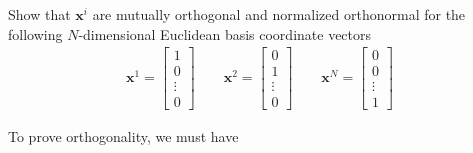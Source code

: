 \noindent 

\begin{homework}
	Show that $\bm{x}^i$ are mutually orthogonal and normalized \ie orthonormal for the following $N$-dimensional Euclidean basis coordinate vectors
	\begin{align}
		\bm{x}^1 = \begin{bmatrix}
			1 \\ 0 \\ \vdots \\ 0
		\end{bmatrix}
		\qquad
		\bm{x}^2 = \begin{bmatrix}
			0 \\ 1 \\ \vdots \\ 0
		\end{bmatrix}
		\qquad
		\bm{x}^N = \begin{bmatrix}
			0 \\ 0 \\ \vdots \\ 1
		\end{bmatrix}
	\end{align}
\end{homework}

\begin{solution}
	To prove orthogonality, we must have %
	
\end{solution}